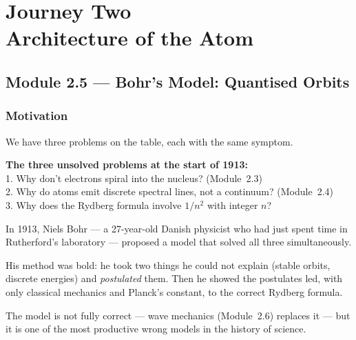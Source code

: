 \documentclass[12pt, a4paper]{book}
\begin{document}
\setcounter{chapter}{1}
\chapter[Journey 2 --- Architecture of the Atom]
        {Journey Two\\[8pt]
         \textcolor{ModuleColor}{\large Architecture of the Atom}}
\setcounter{section}{4}

\section{Module 2.5 --- Bohr's Model: Quantised Orbits}
\label{sec:mod2.5}

\subsection*{Motivation}

We have three problems on the table, each with the same symptom.

\begin{center}
\begin{tcolorbox}[enhanced, colback=JourneyColor!6, colframe=JourneyColor,
  width=0.9\textwidth, arc=3pt]
\centering\sffamily\small
\textbf{The three unsolved problems at the start of 1913:}\\[6pt]
1. Why don't electrons spiral into the nucleus? (Module~2.3)\\[3pt]
2. Why do atoms emit discrete spectral lines, not a continuum? (Module~2.4)\\[3pt]
3. Why does the Rydberg formula involve $1/n^2$ with integer $n$?
\end{tcolorbox}
\end{center}

\vspace{0.5em}

In 1913, Niels Bohr --- a 27-year-old Danish physicist who had
just spent time in Rutherford's laboratory --- proposed a model
that solved all three simultaneously.

His method was bold: he took two things he could not explain
(stable orbits, discrete energies) and \emph{postulated} them.
Then he showed the postulates led, with only classical mechanics
and Planck's constant, to the correct Rydberg formula.

The model is not fully correct --- wave mechanics (Module~2.6)
replaces it --- but it is one of the most productive wrong
models in the history of science.
\end{document}
